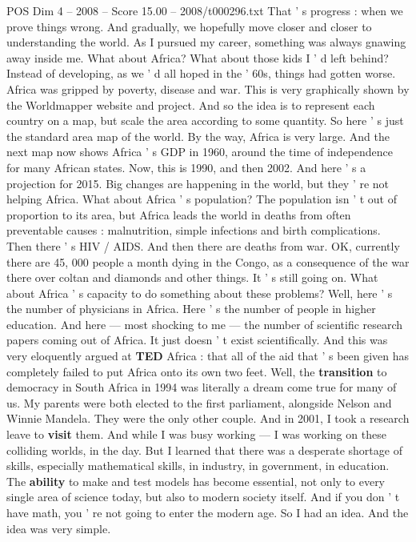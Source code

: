 \begin{textsample}{POS Dim 4 – 2008 – Score 15.00 – 2008/t000296.txt}
That ' s progress : when we prove things wrong.
And gradually, we hopefully move closer and closer to understanding the world.
As I pursued my career, something was always gnawing away inside me.
What about Africa?
What about those kids I ' d left behind?
Instead of developing, as we ' d all hoped in the ' 60s, things had gotten worse.
Africa was gripped by poverty, disease and war.
This is very graphically shown by the Worldmapper website and project.
And so the idea is to represent each country on a map, but scale the area according to some quantity.
So here ' s just the standard area map of the world.
By the way, Africa is very large.
And the next map now shows Africa ' s GDP in 1960, around the time of independence for many African states.
Now, this is 1990, and then 2002.
And here ' s a projection for 2015.
Big changes are happening in the world, but they ' re not helping Africa.
What about Africa ' s population?
The population isn ' t out of proportion to its area, but Africa leads the world in deaths from often preventable causes : malnutrition, simple infections and birth complications.
Then there ' s HIV / AIDS.
And then there are deaths from war.
OK, currently there are 45, 000 people a month dying in the Congo, as a consequence of the war there over coltan and diamonds and other things.
It ' s still going on.
What about Africa ' s capacity to do something about these problems?
Well, here ' s the number of physicians in Africa.
Here ' s the number of people in higher education.
And here — most shocking to me — the number of scientific research papers coming out of Africa.
It just doesn ' t exist scientifically.
And this was very eloquently argued at \textbf{TED} Africa : that all of the aid that ' s been given has completely failed to put Africa onto its own two feet.
Well, the \textbf{transition} to democracy in South Africa in 1994 was literally a dream come true for many of us.
My parents were both elected to the first parliament, alongside Nelson and Winnie Mandela.
They were the only other couple.
And in 2001, I took a research leave to \textbf{visit} them.
And while I was busy working — I was working on these colliding worlds, in the day.
But I learned that there was a desperate shortage of skills, especially mathematical skills, in industry, in government, in education.
The \textbf{ability} to make and test models has become essential, not only to every single area of science today, but also to modern society itself.
And if you don ' t have math, you ' re not going to enter the modern age.
So I had an idea.
And the idea was very simple.

\end{textsample}
